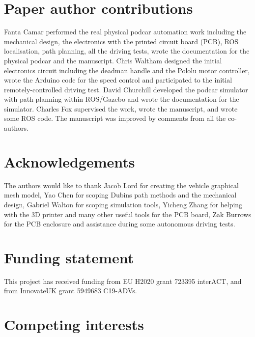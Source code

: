 \documentclass[a4paper]{article}
\begin{document}
	
	
	\section*{Paper author contributions}\label{h.fy8hbipy6kwe}
	
	Fanta Camar performed the real physical podcar automation work including the mechanical design, the electronics with the printed circuit board (PCB), ROS localisation, path planning, all the driving tests, wrote the documentation for the physical podcar and the manuscript. Chris Waltham designed the initial electronics circuit including the deadman handle and the Pololu motor controller, wrote the Arduino code for the speed control and participated to the initial remotely-controlled driving test. David Churchill developed the podcar simulator with path planning within ROS/Gazebo and wrote the documentation for the simulator. Charles Fox supervised the work, wrote the manuscript, and wrote some ROS code. The manuscript was improved by comments from all the co-authors.
	
	
	\section*{Acknowledgements}\label{h.gu3yyarx72d6}
	
	The authors would like to thank Jacob Lord for creating the vehicle graphical mesh model, Yao Chen for scoping Dubins path methods and the mechanical design, Gabriel Walton for scoping simulation tools, Yicheng Zhang for helping with the 3D printer and many other useful tools for the PCB board, Zak Burrows for the PCB enclosure and assistance during some autonomous driving tests.
	
	
	\section*{Funding statement}\label{h.4u1a7tugh2om}
	
	
	This project has received funding from EU H2020 grant 723395 interACT, and from InnovateUK  grant 5949683 C19-ADVs.
	
	
	\section*{Competing interests}\label{h.q1j1rznb43fl}
	
\end{document}
